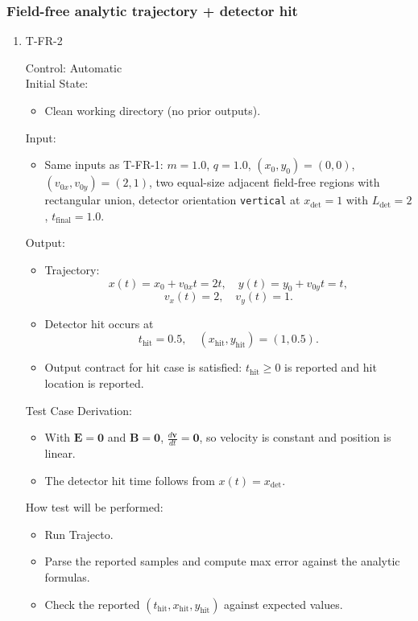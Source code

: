 \documentclass[12pt, titlepage]{article}
\begin{document}
\subsubsection{Field-free analytic trajectory + detector hit}

\begin{enumerate}

\item{T-FR-2\\}

Control: Automatic\\

Initial State:
\begin{itemize}
  \item Clean working directory (no prior outputs).
\end{itemize}

Input:
\begin{itemize}
  \item Same inputs as T-FR-1:
  $m = 1.0$, $q = 1.0$, $(x_0,y_0)=(0,0)$, $(v_{0x},v_{0y})=(2,1)$,
  two equal-size adjacent field-free regions with rectangular union, detector
  orientation \texttt{vertical} at $x_{\mathrm{det}}=1$ with
  $L_{\mathrm{det}}=2$,
  $t_{\text{final}}=1.0$.
\end{itemize}

Output:
\begin{itemize}
  \item Trajectory:
  \[
    x(t)=x_0+v_{0x}t=2t,\quad y(t)=y_0+v_{0y}t=t,
  \]
  \[
    v_x(t)=2,\quad v_y(t)=1.
  \]
  \item Detector hit occurs at
  \[
    t_{\mathrm{hit}} = 0.5,\quad (x_{\mathrm{hit}},y_{\mathrm{hit}})=(1,0.5).
  \]
  \item Output contract for hit case is satisfied:
  $t_{\mathrm{hit}}\ge 0$ is reported and hit location is reported.
\end{itemize}

Test Case Derivation:
\begin{itemize}
  \item With $\mathbf{E}=\mathbf{0}$ and $\mathbf{B}=\mathbf{0}$, $\frac{d\mathbf{v}}{dt}=\mathbf{0}$, so velocity is constant and position is linear.
  \item The detector hit time follows from $x(t)=x_{\mathrm{det}}$.
\end{itemize}

How test will be performed:
\begin{itemize}
  \item Run Trajecto.
  \item Parse the reported samples and compute max error against the analytic formulas.
  \item Check the reported $(t_{\mathrm{hit}}, x_{\mathrm{hit}}, y_{\mathrm{hit}})$ against expected values.
\end{itemize}

\end{enumerate}
\end{document}
